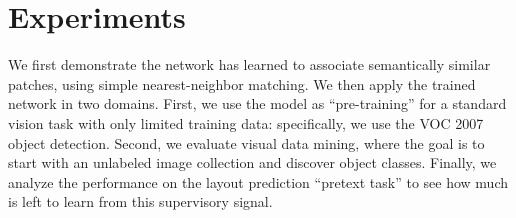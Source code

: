 \documentclass[10pt,twocolumn,letterpaper]{article}
\newcommand{\todo}[1]{\textcolor{red}{TODO: #1}\PackageWarning{TODO:}{#1!}}
\begin{document}


\vspace{-0.1in}
\section{Experiments}
\vspace{-0.05in}



We first demonstrate the network has learned to associate semantically similar patches, using simple nearest-neighbor matching.  We then apply the trained network in two domains.  
First, we use the model as ``pre-training'' for a standard vision task with only limited training data: specifically, we use the VOC 2007 object detection.  Second, we evaluate visual data mining, where the goal is to start with an unlabeled image collection and discover object classes. 
Finally, we analyze the performance on the layout prediction ``pretext task'' to see how much is left to learn from this supervisory signal.

\vspace{-0.05in}
\end{document}
